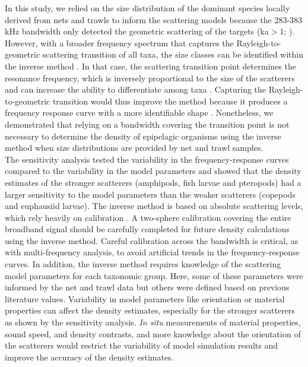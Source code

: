 In this study, we relied on the size distribution of the dominant species locally derived from nets and trawls to inform the scattering models because the 283-383 kHz bandwidth only detected the geometric scattering of the targets (ka$>$1; \citealt{Lavery2010}). However, with a broader frequency spectrum that captures the Rayleigh-to-geometric scattering transition of all taxa, the size classes can be identified within the inverse method \citep{Greenlaw1979, Lavery2007, Cotter2021}. In that case, the scattering transition point determines the resonance frequency, which is inversely proportional to the size of the scatterers and can increase the ability to differentiate among taxa \citep{Holliday1995, Warren2003, BenoitBird2009}. Capturing the Rayleigh-to-geometric transition would thus improve the method because it produces a frequency response curve with a more identifiable shape \citep{Cotter2021}. Nonetheless, we demonstrated that relying on a bandwidth covering the transition point is not necessary to determine the density of epipelagic organisms using the inverse method when size distributions are provided by net and trawl samples.\\
The sensitivity analysis tested the variability in the frequency-response curves compared to the variability in the model parameters and showed that the density estimates of the stronger scatterers (amphipods, fish larvae and pteropods) had a larger sensitivity to the model parameters than the weaker scatterers (copepods and euphausiid larvae). The inverse method is based on absolute scattering levels, which rely heavily on calibration \citep{Lavery2007}. A two-sphere calibration covering the entire broadband signal should be carefully completed for future density calculations using the inverse method. Careful calibration across the bandwidth is critical, as with multi-frequency analysis, to avoid artificial trends in the frequency-response curves. In addition, the inverse method requires knowledge of the scattering model parameters for each taxonomic group. Here, some of these parameters were informed by the net and trawl data but others were defined based on previous literature values. Variability in model parameters like orientation or material properties can affect the density estimates, especially for the stronger scatterers as shown by the sensitivity analysis. \textit{In situ} measurements of material properties, sound speed, and density contrasts, and more knowledge about the orientation of the scatterers would restrict the variability of model simulation results and improve the accuracy of the density estimates. \\
